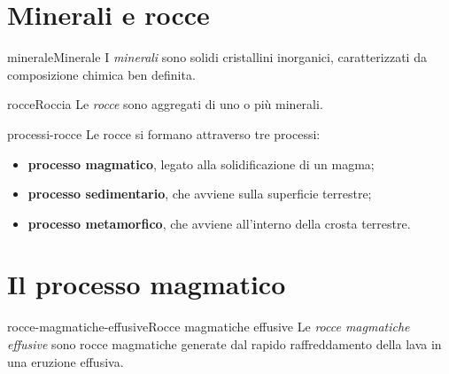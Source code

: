 \documentclass[preview]{standalone}
\begin{document}
\genpage

\section{Minerali e rocce}

\begin{snippetdefinition}{minerale}{Minerale}
    I \textit{minerali} sono solidi cristallini inorganici, caratterizzati da composizione chimica ben definita.
\end{snippetdefinition}

\begin{snippetdefinition}{rocce}{Roccia}
    Le \textit{rocce} sono aggregati di uno o più minerali.
\end{snippetdefinition}

\begin{snippet}{processi-rocce}
    Le rocce si formano attraverso tre processi:
    \begin{itemize}
        \item \textbf{processo magmatico}, legato alla solidificazione di un magma;
        \item \textbf{processo sedimentario}, che avviene sulla superficie terrestre;
        \item \textbf{processo metamorfico}, che avviene all'interno della crosta terrestre.
    \end{itemize}
\end{snippet}

\section{Il processo magmatico}


\begin{snippetdefinition}{rocce-magmatiche-effusive}{Rocce magmatiche effusive}
    Le \textit{rocce magmatiche effusive} sono rocce magmatiche generate dal rapido raffreddamento
    della lava in una eruzione effusiva.
\end{snippetdefinition}
\end{document}
